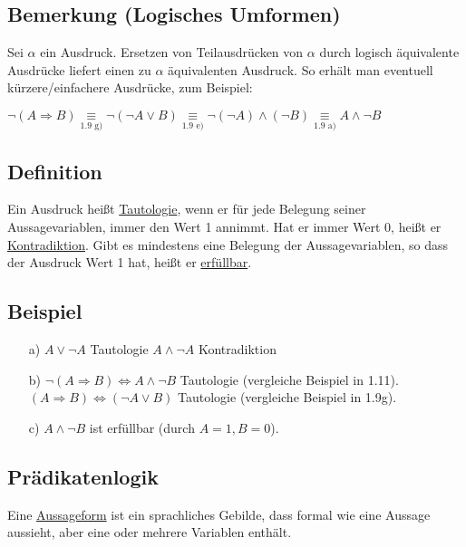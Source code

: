 \documentclass[a4paper, 12pt, twoside] {article}
\begin{document}
\subsection{Bemerkung (Logisches Umformen)}
Sei $\alpha$ ein Ausdruck. Ersetzen von Teilausdrücken von $\alpha$ durch logisch äquivalente Ausdrücke liefert einen zu $\alpha$ äquivalenten Ausdruck. So erhält man eventuell kürzere/einfachere Ausdrücke, zum Beispiel:

$\neg (A \Rightarrow B) \underset{\text{1.9 g})}{\equiv} \neg (\neg A \lor B) \underset{\text{1.9 e)}}{\equiv} \neg (\neg A) \wedge (\neg B) \underset{\text{1.9 a)}}{\equiv} A \wedge \neg B$


\subsection{Definition}
Ein Ausdruck heißt \underline{Tautologie}, wenn er für jede Belegung seiner Aussagevariablen, immer den Wert 1 annimmt. Hat er immer Wert 0, heißt er \underline{Kontradiktion}. 
Gibt es mindestens eine Belegung der Aussagevariablen, so dass der Ausdruck Wert 1 hat, heißt er \underline{erfüllbar}.

\subsection{Beispiel}
\begin{itemize}
\item[a)] $A \lor \neg A$ Tautologie \newline $A \wedge \neg A$ Kontradiktion

\item[b)] $\neg (A \Rightarrow B ) \Leftrightarrow A \wedge \neg B$ Tautologie (vergleiche Beispiel in 1.11). \newline
$(A \Rightarrow B) \Leftrightarrow (\neg A \lor B)$ Tautologie (vergleiche Beispiel in 1.9g).

\item[c)] $A \wedge \neg B$ ist erfüllbar (durch $A = 1, B = 0$).
\end{itemize}

\subsection*{Prädikatenlogik}
Eine \underline{Aussageform} ist ein sprachliches Gebilde, dass formal wie eine Aussage aussieht, aber eine oder mehrere Variablen enthält.
\end{document}
